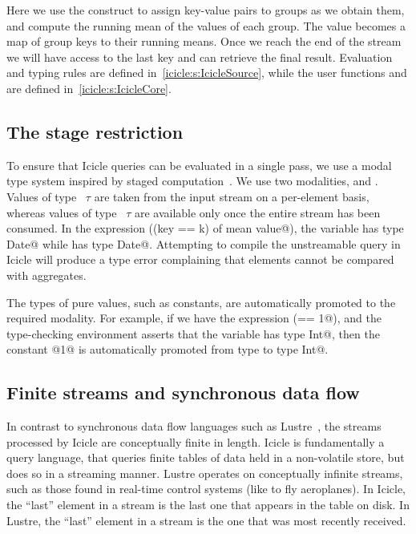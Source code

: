Here we use the \Ic@group@ construct to assign key-value pairs to groups as we obtain them, and compute the running mean of the values of each group. The \Ic@avgs@ value becomes a map of group keys to their running means. Once we reach the end of the stream we will have access to the last key and can retrieve the final result.
Evaluation and typing rules are defined in~\cref{icicle:s:IcicleSource}, while the user functions \Ic@last@ and \Ic@mean@ are defined in~\cref{icicle:s:IcicleCore}.


\subsection{The stage restriction}
To ensure that Icicle queries can be evaluated in a single pass, we use a modal type system inspired by staged computation~\cite{davies2001modal}.
We use two modalities, \Ic@Element@ and \Ic@Aggregate@.
Values of type \Ic@Element@~$\tau$ are taken from the input stream on a per-element basis, whereas values of type \Ic@Aggregate@~$\tau$ are available only once the entire stream has been consumed.
In the expression (\Ic@filter (key == k) of mean value@), the variable \Ic@key@ has type \Ic@Element Date@ while \Ic@k@ has type \Ic@Aggregate Date@.
Attempting to compile the unstreamable query in Icicle will produce a type error complaining that elements cannot be compared with aggregates.

The types of pure values, such as constants, are automatically promoted to the required modality.
For example, if we have the expression (\Ic@open == 1@), and the type-checking environment asserts that the variable \Ic@open@ has type \Ic@Element Int@, then the constant @1@ is automatically promoted from type \Ic@Int@ to type \Ic@Element Int@.


\subsection{Finite streams and synchronous data flow}
In contrast to synchronous data flow languages such as {\sc Lustre}~\cite{halbwachs1991synchronous}, the streams processed by Icicle are conceptually finite in length.
Icicle is fundamentally a query language, that queries finite tables of data held in a non-volatile store, but does so in a streaming manner.
{\sc Lustre} operates on conceptually infinite streams, such as those found in real-time control systems (like to fly aeroplanes).
In Icicle, the ``last'' element in a stream is the last one that appears in the table on disk.
In {\sc Lustre}, the ``last'' element in a stream is the one that was most recently received.

